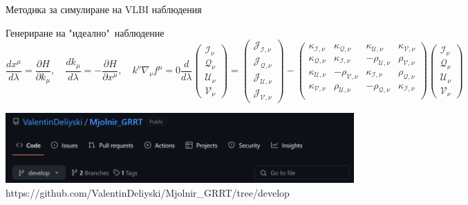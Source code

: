\documentclass[hyperref={colorlinks,citecolor=blue,linkcolor=blue,urlcolor=blue}]{beamer}
\begin{document}
	\begin{frame}{Методика за симулиране на VLBI наблюдения}
		
		\begin{block}{Генериране на "идеално"$\,$ наблюдение}
			\small
			\begin{subequations}
				\begin{equation*}
					\frac{dx^\mu}{d\lambda} = \frac{\partial H}{\partial k_\mu},\quad \frac{d k_\mu}{d\lambda} = - \frac{\partial H}{\partial x^\mu},\quad 
					k^\nu\nabla_\nu f^\mu = 0
				\end{equation*}
				\begin{equation*}
					\frac{d}{d\lambda} \begin{pmatrix}
						\mathcal{I}_\nu\\
						\mathcal{Q}_\nu\\
						\mathcal{U}_\nu\\
						\mathcal{V}_\nu
					\end{pmatrix} = 
					\begin{pmatrix}
						\mathcal{J}_\mathcal{I,\nu}\\
						\mathcal{J}_\mathcal{Q,\nu}\\
						\mathcal{J}_\mathcal{U,\nu}\\
						\mathcal{J}_\mathcal{V,\nu}
					\end{pmatrix}
					-	\begin{pmatrix}
						\kappa_\mathcal{I,\nu} & \kappa_\mathcal{Q,\nu} & \kappa_\mathcal{U,\nu} & \kappa_\mathcal{V,\nu}\\
						\kappa_\mathcal{Q,\nu}& \kappa_\mathcal{I,\nu}& -\rho_\mathcal{U,\nu}& \rho_\mathcal{V,\nu}\\     	
						\kappa_\mathcal{U,\nu}& -\rho_\mathcal{V,\nu}& \kappa_\mathcal{I,\nu}& \rho_\mathcal{Q,\nu}\\	  
						\kappa_\mathcal{V,\nu}& \rho_\mathcal{U,\nu}& -\rho_\mathcal{Q,\nu}& \kappa_\mathcal{I,\nu}\\
					\end{pmatrix}
					\begin{pmatrix}
						\mathcal{I}_\nu\\
						\mathcal{Q}_\nu\\
						\mathcal{U}_\nu\\
						\mathcal{V}_\nu
					\end{pmatrix}
				\end{equation*}
			\end{subequations}
			
		\end{block}
		
		\centering
		\includegraphics[scale = 0.5]{Pre-Defence/github.png}
		\small https://github.com/ValentinDeliyski/Mjolnir\_GRRT/tree/develop
	\end{frame}
	
\end{document}
